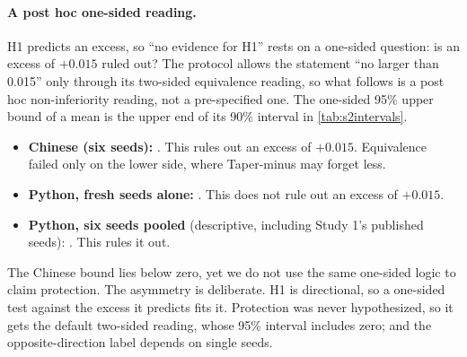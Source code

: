 \documentclass[11pt]{article}
\begin{document}
\paragraph{A post hoc one-sided reading.} H1 predicts an excess, so ``no evidence for H1'' rests on a one-sided
question: is an excess of $+0.015$ ruled out? The protocol allows the statement ``no larger than 0.015'' only
through its two-sided equivalence reading, so what follows is a post hoc non-inferiority reading, not a
pre-specified one. The one-sided 95\% upper bound of a mean is the upper end of its 90\% interval in
\cref{tab:s2intervals}.
\begin{itemize}[leftmargin=1.4em,itemsep=2pt]
  \item \textbf{Chinese (six seeds):} \twoDhiNinety. This rules out an excess of $+0.015$. Equivalence failed only
        on the lower side, where Taper-minus may forget less.
  \item \textbf{Python, fresh seeds alone:} \repDhiNinety. This does not rule out an excess of $+0.015$.
  \item \textbf{Python, six seeds pooled} (descriptive, including Study 1's published seeds): \poolHiNinety. This
        rules it out.
\end{itemize}
The Chinese bound lies below zero, yet we do not use the same one-sided logic to claim protection. The asymmetry
is deliberate. H1 is directional, so a one-sided test against the excess it predicts fits it. Protection was
never hypothesized, so it gets the default two-sided reading, whose 95\% interval includes zero; and the
opposite-direction label depends on single seeds.

\begin{table}[t]
\centering
\small
\caption{Means, SDs and descriptive intervals of the endpoint contrasts (nats/token). The last column is the
pre-specified equivalence reading of Study 2: whether the 90\% interval lies inside $(-0.015, +0.015)$. Study 1
did not pre-specify this reading; its row is shown for comparison.}
\label{tab:s2intervals}
\setlength{\tabcolsep}{4pt}

\end{table}
\end{document}
